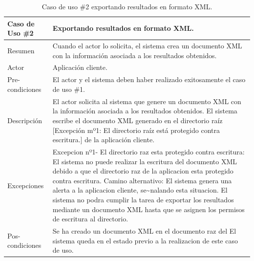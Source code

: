 \begin{table}[H]
\begin{center}
\caption[Caso de uso \#2 exportando resultados en formato XML.]{Caso de uso \#2 exportando resultados en formato XML.}
\label{tab:des-tab02}
\begin{tabular}{|l|>{\raggedright}p{10cm}|}
\hline 
Caso de Uso \#2 & Exportando resultados en formato XML.\tabularnewline
\hline 
\hline 
Resumen & Cuando el actor lo solicita, el sistema crea un documento XML con
la información asociada a los resultados obtenidos.\tabularnewline
\hline 
Actor & Aplicación cliente.\tabularnewline
\hline 
Pre-condiciones & El actor y el sistema deben haber realizado exitosamente el caso de
uso \#1.\tabularnewline
\hline 
Descripción & El actor solicita al sistema que genere un documento XML con la información
asociada a los resultados obtenidos. El sistema escribe el documento
XML generado en el directorio raíz {[}Excepción mº1: El directorio
raíz está protegido contra escritura.{]} de la aplicación cliente.\tabularnewline
\hline 
Excepciones & Excepcion nº1- El directorio raz esta protegido contra escritura:
El sistema no puede realizar la escritura del documento XML debido
a que el directorio raz de la aplicacion esta protegido contra escritura.
Camino alternativo: El sistema genera una alerta a la aplicacion cliente,
se\textasciitilde{}nalando esta situacion. El sistema no podra cumplir
la tarea de exportar los resultados mediante un documento XML hasta
que se asignen los permisos de escritura al directorio.\tabularnewline
\hline 
Pos-condiciones & Se ha creado un documento XML en el documento raz del El sistema queda
en el estado previo a la realizacion de este caso de uso.\tabularnewline
\hline 
\end{tabular}
\end{center}
\end{table}



